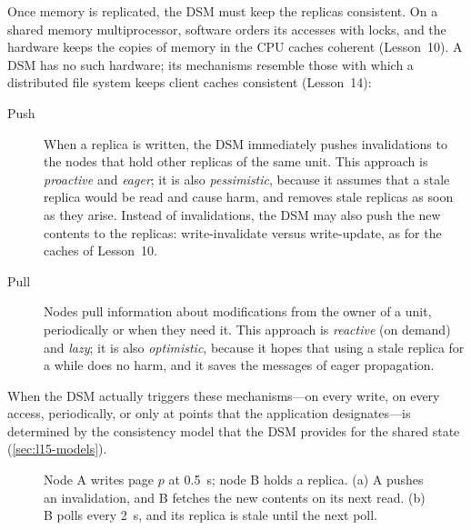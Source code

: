 \documentclass[../main.tex]{subfiles}
\begin{document}
Once memory is replicated, the DSM must keep the replicas
consistent.  On a shared memory multiprocessor, software orders its accesses with
locks, and the hardware keeps the copies of memory in the CPU caches
coherent (Lesson~10).  A DSM has no such hardware; its mechanisms resemble
those with which a distributed file system keeps client caches consistent
(Lesson~14):
\begin{description}
  \item[Push] When a replica is written, the DSM immediately pushes
    invalidations to the nodes that hold other replicas of the same unit.
    This approach is \emph{proactive} and \emph{eager}; it is also
    \emph{pessimistic}, because it assumes that a stale replica would be
    read and cause harm, and removes stale replicas as soon as they
    arise.
    Instead of invalidations, the DSM may also push the new contents to the
    replicas: write-invalidate versus write-update, as for the caches of
    Lesson~10.
  \item[Pull] Nodes pull information about modifications from the owner of
    a unit, periodically or when they need it.  This approach is
    \emph{reactive} (on demand) and \emph{lazy}; it is also
    \emph{optimistic}, because it hopes that using a stale replica for a
    while does no harm, and it saves the messages of eager propagation.
\end{description}
When the DSM actually triggers these mechanisms---on every write, on every
access, periodically, or only at points that the application
designates---is determined by the consistency model that the DSM provides
for the shared state (\cref{sec:l15-models}).

\begin{figure}[htbp]
  \centering
  
  \caption{Node A writes page $p$ at \SI{0.5}{\second}; node B holds a
    replica.  (a) A pushes an invalidation, and B fetches the new contents
    on its next read.  (b) B polls every \SI{2}{\second}, and its replica is
    stale until the next poll.}
  \label{fig:l15-push-pull}
\end{figure}
\end{document}
